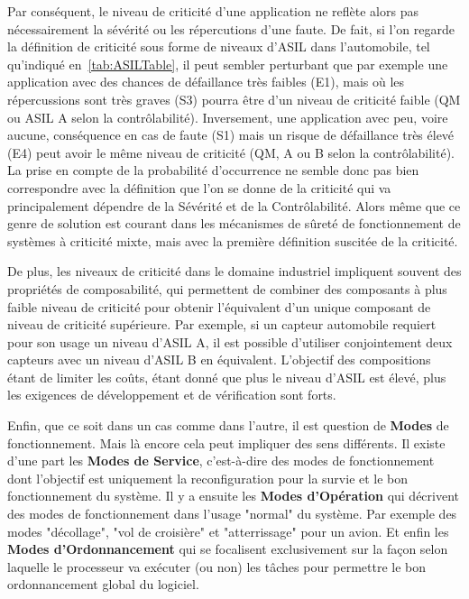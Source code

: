 \documentclass[french, a4paper, 11pt, twoside, pdftex]{StyleThese}
\begin{document}
    Par conséquent, le niveau de criticité d'une application ne reflète alors pas nécessairement la sévérité ou les répercutions d'une faute. De fait, si l'on regarde la définition de criticité sous forme de niveaux d'ASIL dans l'automobile, tel qu'indiqué en~\autoref{tab:ASILTable}, il peut sembler perturbant que par exemple une application avec des chances de défaillance très faibles (E1), mais où les répercussions sont très graves (S3) pourra être d'un niveau de criticité faible (QM ou ASIL A selon la contrôlabilité). Inversement, une application avec peu, voire aucune, conséquence en cas de faute (S1) mais un risque de défaillance très élevé (E4) peut avoir le même niveau de criticité (QM, A ou B selon la contrôlabilité). La prise en compte de la probabilité d'occurrence ne semble donc pas bien correspondre avec la définition que l'on se donne de la criticité qui va principalement dépendre de la Sévérité et de la Contrôlabilité. %
    Alors même que ce genre de solution est courant dans les mécanismes de sûreté de fonctionnement de systèmes à criticité mixte, mais avec la première définition suscitée de la criticité. 
    
    De plus, les niveaux de criticité dans le domaine industriel impliquent souvent des propriétés de composabilité, qui permettent de combiner des composants à plus faible niveau de criticité pour obtenir l'équivalent d'un unique composant de niveau de criticité supérieure. Par exemple, si un capteur automobile requiert pour son usage un niveau d'ASIL A, il est possible d'utiliser conjointement deux capteurs avec un niveau d'ASIL B en équivalent. L'objectif des compositions étant de limiter les coûts, étant donné que plus le niveau d'ASIL est élevé, plus les exigences de développement et de vérification sont forts.
    
    Enfin, que ce soit dans un cas comme dans l'autre, il est question de \textbf{Modes} de fonctionnement. Mais là encore cela peut impliquer des sens différents. Il existe d'une part les \textbf{Modes de Service}, c'est-à-dire des modes de fonctionnement dont l'objectif est uniquement la reconfiguration pour la survie et le bon fonctionnement du système. Il y a ensuite les \textbf{Modes d'Opération} qui décrivent des modes de fonctionnement dans l'usage "normal" du système. Par exemple des modes "décollage", "vol de croisière" et "atterrissage" pour un avion. Et enfin les \textbf{Modes d'Ordonnancement} qui se focalisent exclusivement sur la façon selon laquelle le processeur va exécuter (ou non) les tâches pour permettre le bon ordonnancement global du logiciel.
    
\end{document}
